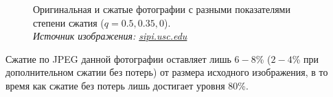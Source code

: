 \documentclass[12pt,a4paper]{article}
\begin{document}
\begin{figure}[!htb]
                \hspace{8pt}%
                \hspace{8pt}%
                \caption[]{Оригинальная и сжатые фотографии с разными показателями степени сжатия ($q=0.5,0.35,0$). \\\textit{Источник изображения: \url{sipi.usc.edu}}}%
                \label{fig:1}%
            \end{figure}

            Сжатие по JPEG данной фотографии оставляет лишь $6-8$\% ($2-4$\% при дополнительном сжатии без потерь) от размера исходного изображения, в то время как сжатие без потерь лишь достигает уровня $80$\%.
\end{document}
